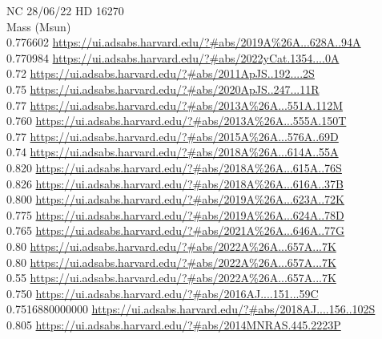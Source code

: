 NC 28/06/22
HD 16270\\

Mass (Msun)\\
0.776602 \url{https://ui.adsabs.harvard.edu/?#abs/2019A%26A...628A..94A}\\
0.770984 \url{https://ui.adsabs.harvard.edu/?#abs/2022yCat.1354....0A}\\
0.72 \url{https://ui.adsabs.harvard.edu/?#abs/2011ApJS..192....2S}\\
0.75 \url{https://ui.adsabs.harvard.edu/?#abs/2020ApJS..247...11R}\\
0.77 \url{https://ui.adsabs.harvard.edu/?#abs/2013A%26A...551A.112M}\\
0.760 \url{https://ui.adsabs.harvard.edu/?#abs/2013A%26A...555A.150T}\\
0.77 \url{https://ui.adsabs.harvard.edu/?#abs/2015A%26A...576A..69D}\\
0.74 \url{https://ui.adsabs.harvard.edu/?#abs/2018A%26A...614A..55A}\\
0.820 \url{https://ui.adsabs.harvard.edu/?#abs/2018A%26A...615A..76S}\\
0.826 \url{https://ui.adsabs.harvard.edu/?#abs/2018A%26A...616A..37B}\\
0.800 \url{https://ui.adsabs.harvard.edu/?#abs/2019A%26A...623A..72K}\\
0.775 \url{https://ui.adsabs.harvard.edu/?#abs/2019A%26A...624A..78D}\\
0.765 \url{https://ui.adsabs.harvard.edu/?#abs/2021A%26A...646A..77G}\\
0.80 \url{https://ui.adsabs.harvard.edu/?#abs/2022A%26A...657A...7K}\\
0.80 \url{https://ui.adsabs.harvard.edu/?#abs/2022A%26A...657A...7K}\\
0.55 \url{https://ui.adsabs.harvard.edu/?#abs/2022A%26A...657A...7K}\\
0.750 \url{https://ui.adsabs.harvard.edu/?#abs/2016AJ....151...59C}\\
0.7516880000000 \url{https://ui.adsabs.harvard.edu/?#abs/2018AJ....156..102S}\\
0.805 \url{https://ui.adsabs.harvard.edu/?#abs/2014MNRAS.445.2223P}\\


